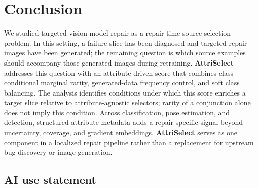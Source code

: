 \documentclass[10pt,twocolumn,letterpaper]{article}
\newcommand{\modelname}{AttriSelect}
\newcommand{\model}{\textcolor{darkteal}{\textbf{\modelname}}\xspace}
\begin{document}

\section{Conclusion}

We studied targeted vision model repair as a repair-time source-selection problem. In this setting, a failure slice has been diagnosed and targeted repair images have been generated; the remaining question is which source examples should accompany those generated images during retraining. \model addresses this question with an attribute-driven score that combines class-conditional marginal rarity, generated-data frequency control, and soft class balancing. The analysis identifies conditions under which this score enriches a target slice relative to attribute-agnostic selectors; rarity of a conjunction alone does not imply this condition. Across classification, pose estimation, and detection, structured attribute metadata adds a repair-specific signal beyond uncertainty, coverage, and gradient embeddings. \model serves as one component in a localized repair pipeline rather than a replacement for upstream bug discovery or image generation.

\subsection*{AI use statement}
\end{document}
